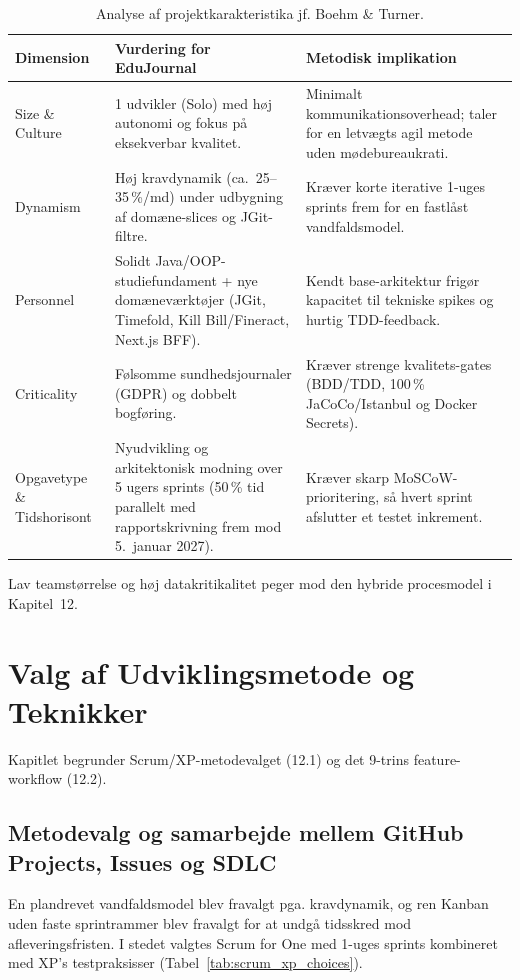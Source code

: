 \documentclass[11pt,a4paper]{article}
\begin{document}
\begin{table}[H]
\centering
\small
\begin{tabularx}{\textwidth}{P{3.0cm} Y Y}
\toprule
\textbf{Dimension} & \textbf{Vurdering for EduJournal} & \textbf{Metodisk implikation} \\
\midrule
Size \& Culture & 1 udvikler (Solo) med høj autonomi og fokus på eksekverbar kvalitet. & Minimalt kommunikationsoverhead; taler for en letvægts agil metode uden mødebureaukrati. \\
\midrule
Dynamism & Høj kravdynamik (ca.~25--35\,\%/md) under udbygning af domæne-slices og JGit-filtre. & Kræver korte iterative 1-uges sprints frem for en fastlåst vandfaldsmodel. \\
\midrule
Personnel & Solidt Java/OOP-studiefundament + nye domæneværktøjer (JGit, Timefold, Kill Bill/Fineract, Next.js BFF). & Kendt base-arkitektur frigør kapacitet til tekniske spikes og hurtig TDD-feedback. \\
\midrule
Criticality & Følsomme sundhedsjournaler (GDPR) og dobbelt bogføring. & Kræver strenge kvalitets-gates (BDD/TDD, 100\,\% JaCoCo/Istanbul og Docker Secrets). \\
\midrule
Opgavetype \& Tidshorisont & Nyudvikling og arkitektonisk modning over 5 ugers sprints (50\,\% tid parallelt med rapportskrivning frem mod 5.~januar 2027). & Kræver skarp MoSCoW-prioritering, så hvert sprint afslutter et testet inkrement. \\
\bottomrule
\end{tabularx}
\caption{Analyse af projektkarakteristika jf. Boehm \& Turner.}
\label{tab:boehm_turner_table}
\end{table}

Lav teamstørrelse og høj datakritikalitet peger mod den hybride procesmodel i Kapitel~12.

\section{Valg af Udviklingsmetode og Teknikker}
Kapitlet begrunder Scrum/XP-metodevalget (12.1) og det 9-trins feature-workflow (12.2).

\subsection{Metodevalg og samarbejde mellem GitHub Projects, Issues og SDLC}
En plandrevet vandfaldsmodel blev fravalgt pga. kravdynamik, og ren Kanban uden faste sprintrammer blev fravalgt for at undgå tidsskred mod afleveringsfristen. I stedet valgtes Scrum for One \cite{schwaber2020} med 1-uges sprints kombineret med XP's testpraksisser \cite{beck2004} (Tabel~\ref{tab:scrum_xp_choices}).
\end{document}
